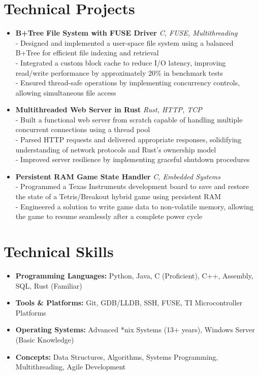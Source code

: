 \documentclass[11pt]{article}
\begin{document}
\section*{Technical Projects}
\vspace{-0.1in}
\begin{itemize}[leftmargin=*]
    \item \textbf{B+Tree File System with FUSE Driver} \hfill \textit{C, FUSE, Multithreading} \\
    - Designed and implemented a user-space file system using a balanced B+Tree for efficient file indexing and retrieval \\
    - Integrated a custom block cache to reduce I/O latency, improving read/write performance by approximately 20\% in benchmark tests \\
    - Ensured thread-safe operations by implementing concurrency controls, allowing simultaneous file access
    
    \item \textbf{Multithreaded Web Server in Rust} \hfill \textit{Rust, HTTP, TCP} \\
    - Built a functional web server from scratch capable of handling multiple concurrent connections using a thread pool \\
    - Parsed HTTP requests and delivered appropriate responses, solidifying understanding of network protocols and Rust's ownership model \\
    - Improved server resilience by implementing graceful shutdown procedures
    
    \item \textbf{Persistent RAM Game State Handler} \hfill \textit{C, Embedded Systems} \\
    - Programmed a Texas Instruments development board to save and restore the state of a Tetris/Breakout hybrid game using persistent RAM \\
    - Engineered a solution to write game data to non-volatile memory, allowing the game to resume seamlessly after a complete power cycle
\end{itemize}

\section*{Technical Skills}
\vspace{-0.1in}
\begin{itemize}[leftmargin=*]
    \item \textbf{Programming Languages:} Python, Java, C (Proficient), C++, Assembly, SQL, Rust (Familiar)
    \item \textbf{Tools \& Platforms:} Git, GDB/LLDB, SSH, FUSE, TI Microcontroller Platforms
    \item \textbf{Operating Systems:} Advanced *nix Systems (13+ years), Windows Server (Basic Knowledge)
    \item \textbf{Concepts:} Data Structures, Algorithms, Systems Programming, Multithreading, Agile Development
\end{itemize}
\end{document}
